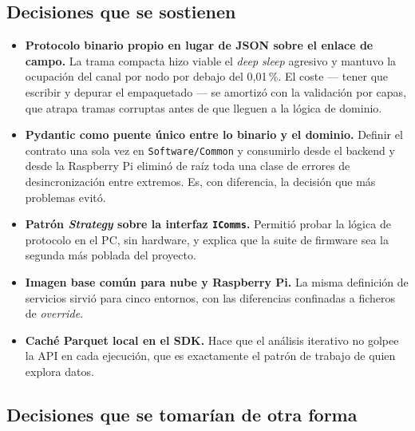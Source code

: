 \subsection*{Decisiones que se sostienen}

\begin{itemize}[leftmargin=*, label=--]
    \item \textbf{Protocolo binario propio en lugar de JSON sobre el enlace de
          campo.} La trama compacta hizo viable el \textit{deep sleep} agresivo y
          mantuvo la ocupación del canal por nodo por debajo del 0,01\,\%. El coste
          --- tener que escribir y depurar el empaquetado --- se amortizó con la
          validación por capas, que atrapa tramas corruptas antes de que lleguen a
          la lógica de dominio.
    \item \textbf{Pydantic como puente único entre lo binario y el dominio.}
          Definir el contrato una sola vez en \texttt{Software/Common} y consumirlo
          desde el backend y desde la Raspberry Pi eliminó de raíz toda una clase
          de errores de desincronización entre extremos. Es, con diferencia, la
          decisión que más problemas evitó.
    \item \textbf{Patrón \textit{Strategy} sobre la interfaz \texttt{IComms}.}
          Permitió probar la lógica de protocolo en el PC, sin hardware, y explica
          que la suite de firmware sea la segunda más poblada del proyecto.
    \item \textbf{Imagen base común para nube y Raspberry Pi.} La misma
          definición de servicios sirvió para cinco entornos, con las diferencias
          confinadas a ficheros de \textit{override}.
    \item \textbf{Caché Parquet local en el SDK.} Hace que el análisis iterativo
          no golpee la API en cada ejecución, que es exactamente el patrón de
          trabajo de quien explora datos.
\end{itemize}

\subsection*{Decisiones que se tomarían de otra forma}

